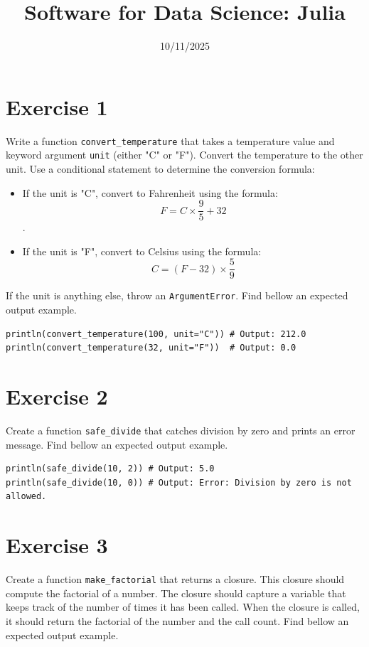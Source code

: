 \documentclass{article}
\title{Software for Data Science: Julia}
\date{10/11/2025}
\begin{document}
\maketitle
\section*{Exercise 1}

Write a function \texttt{convert\_temperature} that takes a temperature value and keyword argument \texttt{unit} (either "C" or "F"). Convert the temperature to the other unit. Use a conditional statement to determine the conversion formula:

\begin{itemize}
    \item If the unit is "C", convert to Fahrenheit using the formula: 
        $$F = C \times \frac{9}{5} + 32 $$.
    \item If the unit is "F", convert to Celsius using the formula: 
        $$C = (F-32) \times \frac{5}{9} $$
\end{itemize}

If the unit is anything else, throw an \texttt{ArgumentError}. Find bellow an expected output example.

\begin{verbatim}
println(convert_temperature(100, unit="C")) # Output: 212.0
println(convert_temperature(32, unit="F"))  # Output: 0.0
\end{verbatim}

\section*{Exercise 2}

Create a function \texttt{safe\_divide} that catches division by zero and prints an error message. Find bellow an expected output example.

\begin{verbatim}
println(safe_divide(10, 2)) # Output: 5.0
println(safe_divide(10, 0)) # Output: Error: Division by zero is not allowed.
\end{verbatim}

\section*{Exercise 3}

Create a function \texttt{make\_factorial} that returns a closure. This closure should compute the factorial of a number. The closure should capture a variable that keeps track of the number of times it has been called. When the closure is called, it should return the factorial of the number and the call count. Find bellow an expected output example.
\end{document}
